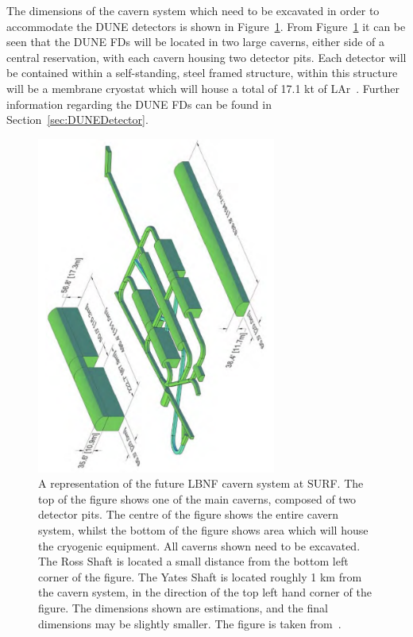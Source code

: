 The dimensions of the cavern system which need to be excavated in order to accommodate the DUNE detectors is shown in Figure~\ref{fig:DUNECavernSystem}. From Figure~\ref{fig:DUNECavernSystem} it can be seen that the DUNE FDs will be located in two large caverns, either side of a central reservation, with each cavern housing two detector pits. Each detector will be contained within a self-standing, steel framed structure, within this structure will be a membrane cryostat which will house a total of 17.1 kt of LAr~\citep{DUNECDR_V3}. Further information regarding the DUNE FDs can be found in Section~\ref{sec:DUNEDetector}. \\

\begin{figure}
  \centering
  \includegraphics[width=0.7\textwidth]{DUNECavernSystem}
  \caption[A representation of the future LBNF cavern system at SURF]
          {A representation of the future LBNF cavern system at SURF. The top of the figure shows one of the main caverns, composed of two detector pits. The centre of the figure shows the entire cavern system, whilst the bottom of the figure shows area which will house the cryogenic equipment. All caverns shown need to be excavated. The Ross Shaft is located a small distance from the bottom left corner of the figure. The Yates Shaft is located roughly 1 km from the cavern system, in the direction of the top left hand corner of the figure. The dimensions shown are estimations, and the final dimensions may be slightly smaller. The figure is taken from~\citep{DUNECDR_V3}.}
  \label{fig:DUNECavernSystem}
\end{figure}

